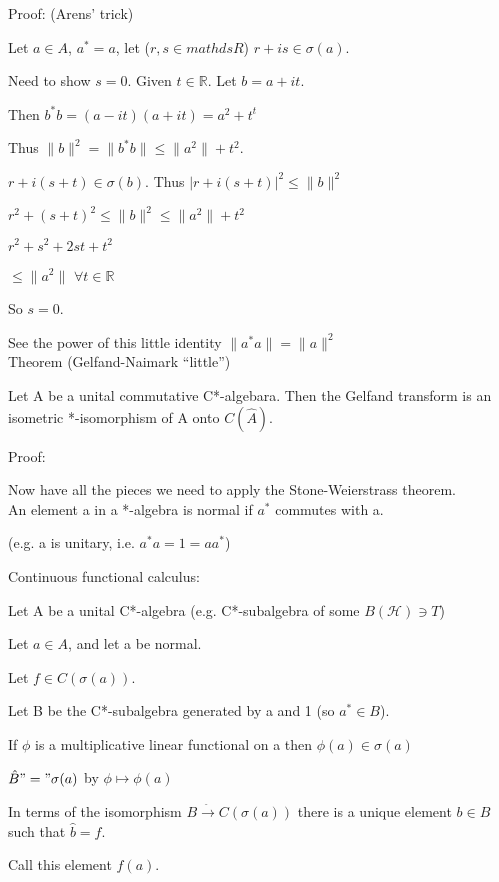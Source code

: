 \documentclass[12pt]{article}
\newcommand{\conj}{^*}
\newcommand{\sq}{^2}
\begin{document}
\noindent
Proof: (Arens' trick)

Let $a \in A$, $a\conj = a$, let ($r, s \in mathds{R}$) $r + is \in \sigma(a)$.

Need to show $s = 0$.  Given $t \in \mathds{R}$.  Let $b = a + it$.

Then $b\conj b = (a - it)(a + it) = a^2 + t^t$

Thus $\|b\|^2 = \|b\conj b\| \leq \|a\sq\| + t\sq$.

$r + i(s + t) \in \sigma(b)$.  Thus $|r + i(s + t)|\sq \leq \|b\|\sq$

$r\sq + (s + t)\sq \leq \|b\|\sq \leq \|a\sq\| + t\sq$

$r\sq + s\sq + 2st + t\sq$

$\leq \|a\sq\|$ $\forall t \in \mathds{R}$

So $s = 0$.

See the power of this little identity $\|a\conj a\|=\|a\|\sq$\\

\noindent
Theorem (Gelfand-Naimark ``little'')

Let A be a unital commutative C*-algebara.  Then the Gelfand transform is an isometric *-isomorphism of A onto $C(\hat{A})$.

\noindent
Proof:

Now have all the pieces we need to apply the Stone-Weierstrass theorem.\\

\noindent
An element a in a *-algebra is normal if $a\conj$ commutes with a.

(e.g. a is unitary, i.e. $a\conj a = 1 = aa\conj$)

\noindent
Continuous functional calculus:

Let A be a unital C*-algebra (e.g. C*-subalgebra of some $B(\mathcal{H}) \ni T$)

Let $a \in A$, and let a be normal.

Let $f \in C(\sigma(a))$.

Let B be the C*-subalgebra generated by a and 1 (so $a\conj \in B$).

If $\phi$ is a multiplicative linear functional on a then $\phi(a) \in \sigma(a)$

$\hat{B} "=" \sigma(a)$ by $\phi \mapsto \phi(a)$

In terms of the isomorphism $B \xrightarrow{\hat{}} C(\sigma(a))$ there is a unique element $b \in B$ such that $\hat{b} = f$.

Call this element $f(a)$.
\end{document}
